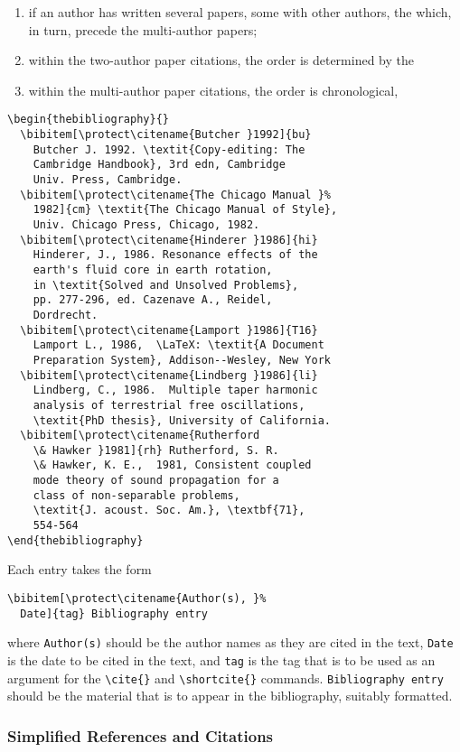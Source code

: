 \begin{enumerate}
  \item if an author has written several papers, some with other authors, the
        which, in turn, precede the multi-author papers;
  \item within the two-author paper citations, the order is determined by the
  \item within the multi-author paper citations, the order is chronological,
\end{enumerate}
%
\begin{verbatim}
\begin{thebibliography}{}
  \bibitem[\protect\citename{Butcher }1992]{bu}
    Butcher J. 1992. \textit{Copy-editing: The
    Cambridge Handbook}, 3rd edn, Cambridge
    Univ. Press, Cambridge.
  \bibitem[\protect\citename{The Chicago Manual }%
    1982]{cm} \textit{The Chicago Manual of Style},
    Univ. Chicago Press, Chicago, 1982.
  \bibitem[\protect\citename{Hinderer }1986]{hi}
    Hinderer, J., 1986. Resonance effects of the
    earth's fluid core in earth rotation,
    in \textit{Solved and Unsolved Problems},
    pp. 277-296, ed. Cazenave A., Reidel,
    Dordrecht.
  \bibitem[\protect\citename{Lamport }1986]{T16}
    Lamport L., 1986,  \LaTeX: \textit{A Document
    Preparation System}, Addison--Wesley, New York
  \bibitem[\protect\citename{Lindberg }1986]{li}
    Lindberg, C., 1986.  Multiple taper harmonic
    analysis of terrestrial free oscillations,
    \textit{PhD thesis}, University of California.
  \bibitem[\protect\citename{Rutherford
    \& Hawker }1981]{rh} Rutherford, S. R.
    \& Hawker, K. E.,  1981, Consistent coupled
    mode theory of sound propagation for a
    class of non-separable problems,
    \textit{J. acoust. Soc. Am.}, \textbf{71},
    554-564
\end{thebibliography}
\end{verbatim}
Each entry takes the form
\begin{verbatim}
\bibitem[\protect\citename{Author(s), }%
  Date]{tag} Bibliography entry
\end{verbatim}
where \verb"Author(s)" should be the author names as they are cited in the text,
\verb"Date" is the date to be cited in the text, and \verb"tag" is the tag that
is to be used as an argument for the \verb"\cite{}" and \verb"\shortcite{}"
commands. \verb"Bibliography entry" should be the material that is to appear in
the bibliography, suitably formatted.

\subsubsection{Simplified References and Citations}

